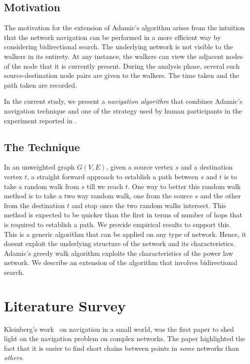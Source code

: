\documentclass[a4paper,12pt]{article}
\begin{document}
\subsection{Motivation}

The motivation for the extension of Adamic's algorithm arises from the intuition that the network navigation can be performed in a more efficient way by considering bidirectional search. The underlying network is not visible to the walkers in its entirety. At any instance, the walkers can view the adjacent nodes of the node that it is currently present. During the analysis phase, several such source-destination node pairs are given to the walkers. The time taken and the path taken are recorded.

In the current study, we present a \emph{navigation algorithm} that combines Adamic's navigation technique and one of the strategy used by human participants in the experiment reported in \cite{sudarshan11}. 

\subsection{The Technique}
In an unweighted graph $G(V,E)$, given a source vertex $s$ and a destination vertex $t$, a straight forward approach to establish a path between $s$ and $t$ is to take a random walk from $s$ till we reach $t$. One way to better this random walk method is to take a two way random walk, one from the source $s$ and the other from the destination $t$ and stop once the two random walks intersect. This method is expected to be quicker than the first in terms of number of hops that is required to establish a path. We provide empirical results to support this.\\

This is a generic algorithm that can be applied on any type of network. Hence, it doesnt exploit the underlying structure of the network and its characteristics. Adamic's greedy walk algorithm exploits the characteristics of the power law network. We describe an extension of the algorithm that involves bidirectional search.

\section{Literature Survey}
\label{sec:4_related_work}
Kleinberg's work~\cite{kleinberg-2-00} on navigation in a small world, was the first paper to shed light on the navigation problem on complex networks. The paper highlighted the fact that {it is easier to find short chains between points in \emph{some} networks than \emph{others}}.\\
\end{document}
